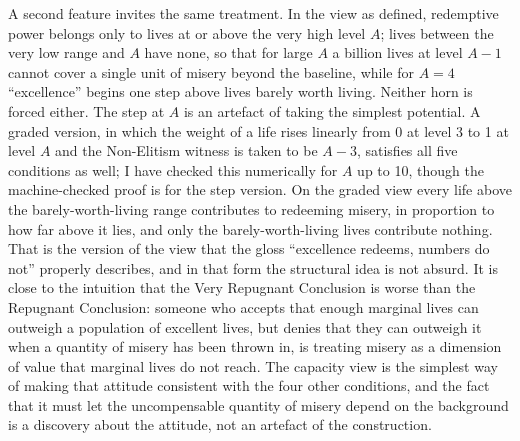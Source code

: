 \documentclass[
  11pt,
  letterpaper,
  DIV=11,
  numbers=noendperiod,
  twoside]{scrartcl}
\newcounter{none} %
\begin{document}
A second feature invites the same treatment. In the view as defined,
redemptive power belongs only to lives at or above the very high level
\(A\); lives between the very low range and \(A\) have none, so that for
large \(A\) a billion lives at level \(A - 1\) cannot cover a single
unit of misery beyond the baseline, while for \(A = 4\) ``excellence''
begins one step above lives barely worth living. Neither horn is forced
either. The step at \(A\) is an artefact of taking the simplest
potential. A graded version, in which the weight of a life rises
linearly from 0 at level 3 to 1 at level \(A\) and the Non-Elitism
witness is taken to be \(A - 3\), satisfies all five conditions as well;
I have checked this numerically for \(A\) up to 10, though the
machine-checked proof is for the step version. On the graded view every
life above the barely-worth-living range contributes to redeeming
misery, in proportion to how far above it lies, and only the
barely-worth-living lives contribute nothing. That is the version of the
view that the gloss ``excellence redeems, numbers do not'' properly
describes, and in that form the structural idea is not absurd. It is
close to the intuition that the Very Repugnant Conclusion is worse than
the Repugnant Conclusion: someone who accepts that enough marginal lives
can outweigh a population of excellent lives, but denies that they can
outweigh it when a quantity of misery has been thrown in, is treating
misery as a dimension of value that marginal lives do not reach. The
capacity view is the simplest way of making that attitude consistent
with the four other conditions, and the fact that it must let the
uncompensable quantity of misery depend on the background is a discovery
about the attitude, not an artefact of the construction.
\end{document}

